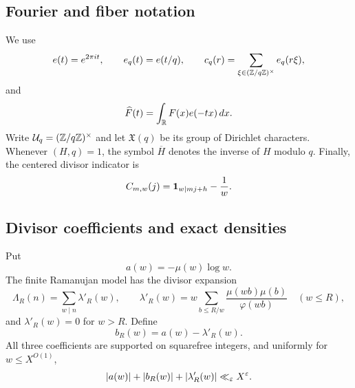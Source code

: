 \subsection{Fourier and fiber notation}

We use
\begin{equation}
 e(t)=e^{2\pi it},\qquad e_q(t)=e(t/q),\qquad
 c_q(r)=\sum_{\xi\in(\mathbb Z/q\mathbb Z)^\times}e_q(r\xi),
 \label{eq:additive-normalizations}
\end{equation}
and
\begin{equation}
 \widehat F(t)=\int_{\mathbb R}F(x)e(-tx)\,dx.
 \label{eq:Fourier-normalization}
\end{equation}
Write \(\mathcal U_q=(\mathbb Z/q\mathbb Z)^\times\) and let
\(\mathfrak X(q)\) be its group of Dirichlet characters.  Whenever
\((H,q)=1\), the symbol \(\overline H\) denotes the inverse of \(H\)
modulo \(q\).  Finally, the centered divisor indicator is
\begin{equation}
 C_{m,w}(j)=\mathbf 1_{w\mid mj+h}-\frac1w.
 \label{eq:centered-divisor-indicator}
\end{equation}

\subsection{Divisor coefficients and exact densities}

Put
\begin{equation}
 a(w)=-\mu(w)\log w.
 \label{eq:a-def}
\end{equation}
The finite Ramanujan model has the divisor expansion
\begin{equation}
 \Lambda_R(n)=\sum_{w\mid n}\lambda'_R(w),
 \qquad
 \lambda'_R(w)=
 w\sum_{b\le R/w}\frac{\mu(wb)\mu(b)}{\varphi(wb)}
 \quad(w\le R),
 \label{eq:lambda-def}
\end{equation}
and \(\lambda'_R(w)=0\) for \(w>R\).  Define
\begin{equation}
 b_R(w)=a(w)-\lambda'_R(w).
 \label{eq:b-def}
\end{equation}
All three coefficients are supported on squarefree integers, and
uniformly for \(w\le X^{O(1)}\),
\begin{equation}
 |a(w)|+|b_R(w)|+|\lambda'_R(w)|
 \ll_\varepsilon X^\varepsilon.
 \label{eq:coefficient-soft}
\end{equation}

